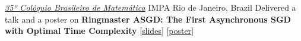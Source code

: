 \documentclass[10pt,a4paper,sans]{moderncv}        %
\newcommand{\kaust}{KAUST}
\newcommand{\thuwal}{Thuwal, Saudi Arabia}
\begin{document}


    {\textcolor{accent}{\href{https://impa.br/evento/35o-coloquio-brasileiro-de-matematica/}{\textit{35º Colóquio Brasileiro de Matemática}}}}
    {IMPA}
    {Rio de Janeiro, Brazil}
    {}{
      Delivered a talk and a poster on 
      \textbf{Ringmaster ASGD: The First Asynchronous SGD\\with Optimal Time Complexity}  
      [{\href{https://artomaranjyan.github.io/assets/pdf/slides/Ringmaster_IMPA.pdf}{slides}}]
      [{\href{https://artomaranjyan.github.io/assets/pdf/posters/Ringmaster_IMPA.pdf}{poster}}] 
    }

\end{document}
